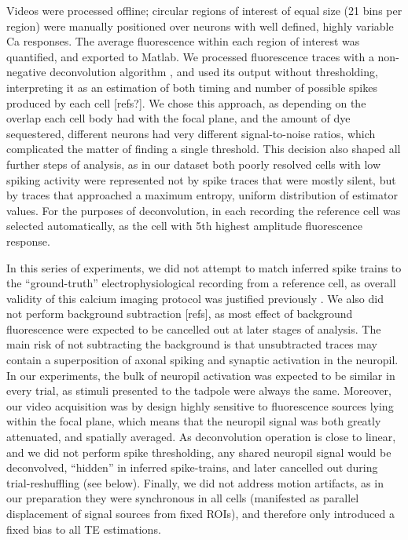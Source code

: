 \documentclass{article}
\begin{document}
Videos were processed offline; circular regions of interest of equal size (21 bins per region) were manually positioned over neurons with well defined, highly variable Ca responses. The average fluorescence within each region of interest was quantified, and exported to Matlab. We processed fluorescence traces with a non-negative deconvolution algorithm \citep{vogelstein2010oopsi}, and used its output without thresholding, interpreting it as an estimation of both timing and number of possible spikes produced by each cell [refs?]. We chose this approach, as depending on the overlap each cell body had with the focal plane, and the amount of dye sequestered, different neurons had very different signal-to-noise ratios, which complicated the matter of finding a single threshold. This decision also shaped all further steps of analysis, as in our dataset both poorly resolved cells with low spiking activity were represented not by spike traces that were mostly silent, but by traces that approached a maximum entropy, uniform distribution of estimator values. For the purposes of deconvolution, in each recording the reference cell was selected automatically, as the cell with 5th highest amplitude fluorescence response.

In this series of experiments, we did not attempt to match inferred spike trains to the “ground-truth” electrophysiological recording from a reference cell, as overall validity of this calcium imaging protocol was justified previously \citep{xu2011,truszkowski2017}. We also did not perform background subtraction [refs], as most effect of background fluorescence were expected to be cancelled out at later stages of analysis. The main risk of not subtracting the background is that unsubtracted traces may contain a superposition of axonal spiking and synaptic activation in the neuropil. In our experiments, the bulk of neuropil activation was expected to be similar in every trial, as stimuli presented to the tadpole were always the same. Moreover, our video acquisition was by design highly sensitive to fluorescence sources lying within the focal plane, which means that the neuropil signal was both greatly attenuated, and spatially averaged. As deconvolution operation is close to linear, and we did not perform spike thresholding, any shared neuropil signal would be deconvolved, “hidden” in inferred spike-trains, and later cancelled out during trial-reshuffling (see below). Finally, we did not address motion artifacts, as in our preparation they were synchronous in all cells (manifested as parallel displacement of signal sources from fixed ROIs), and therefore only introduced a fixed bias to all TE estimations.
\end{document}
